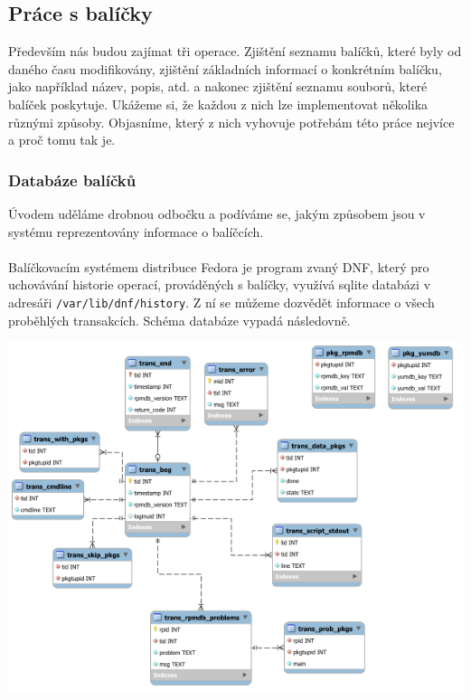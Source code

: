 \documentclass[
  field=inf,
  biblatex,
  glossaries,
  index
]{kidiplom}
\begin{document}
	\subsection{Práce s balíčky}
		Především nás budou zajímat tři operace. Zjištění seznamu balíčků, které byly od daného času modifikovány, zjištění základních informací o konkrétním balíčku, jako například název, popis, atd. a nakonec zjištění seznamu souborů, které balíček poskytuje. Ukážeme si, že každou z nich lze implementovat několika různými způsoby. Objasníme, který z nich vyhovuje potřebám této práce nejvíce a proč tomu tak je.

		\subsubsection{Databáze balíčků}
		Úvodem uděláme drobnou odbočku a podíváme se, jakým způsobem jsou v systému reprezentovány informace o balíčcích.
		\\
		\\
		Balíčkovacím systémem distribuce Fedora je program zvaný DNF\@, který pro uchovávání historie operací, prováděných s balíčky, využívá sqlite databázi v adresáři \texttt{/var/lib/dnf/history}. Z ní se můžeme dozvědět informace o všech proběhlých transakcích. Schéma databáze vypadá následovně.

		\centerline{\includegraphics[scale=0.67]{images/dnf-database.png}}
\end{document}

